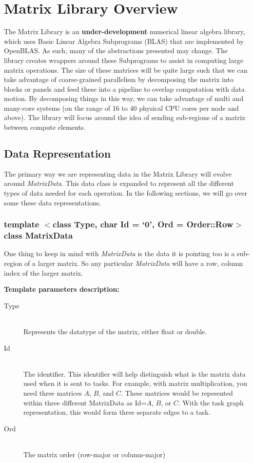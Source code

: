 \documentclass[]{article}
\begin{document}
\section{Matrix Library Overview}
The Matrix Library is an \textbf{under-development} numerical linear algebra library, which uses Basic Linear Algebra Subprograms (BLAS) that are implemented by OpenBLAS. As such, many of the abstractions presented may change. The library creates wrappers around these Subprograms to assist in computing large matrix operations. The size of these matrices will be quite large such that we can take advantage of coarse-grained parallelism by decomposing the matrix into blocks or panels and feed these into a pipeline to overlap computation with data motion. By decomposing things in this way, we can take advantage of multi and many-core systems (on the range of 16 to 40 physical CPU cores per node and above). The library will focus around the idea of sending sub-regions of a matrix between compute elements.

\subsection{Data Representation}
The primary way we are representing data in the Matrix Library will evolve around \emph{MatrixData}. This data class is expanded to represent all the different types of data needed for each operation. In the following sections, we will go over some these data representations.

\subsubsection{template $<$class Type, char Id = `0', Ord = Order::Row$>$ class MatrixData}

One thing to keep in mind with \emph{MatrixData} is the data it is pointing too is a sub-region of a larger matrix. So any particular \emph{MatrixData} will have a row, column index of the larger matrix.


\begin{flushleft}
\textbf{Template parameters description:}
\end{flushleft}
\begin{description}
	\item[Type] \hfill \\
	Represents the datatype of the matrix, either float or double.
 	
 	\item[Id] \hfill \\
 	The identifier. This identifier will help distinguish what is the matrix data used when it is sent to tasks. For example, with matrix multiplication, you need three matrices $A$, $B$, and $C$. These matrices would be repesented within three different MatrixData as Id=$A$, $B$, or $C$. With the task graph representation, this would form three separate edges to a task.
 	
 	\item[Ord] \hfill \\
 	The matrix order (row-major or column-major)
 \end{description}
\end{document}
